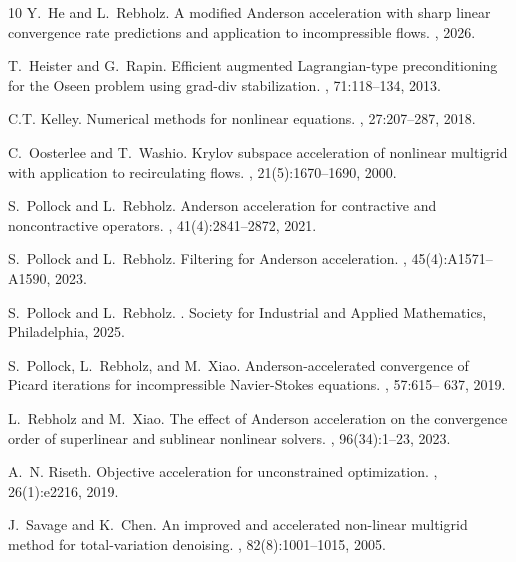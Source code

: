 \documentclass{article}
\numberwithin{equation}{section}
\begin{document}
\begin{thebibliography}{10}
Y.~He and L.~Rebholz.
\newblock A modified {A}nderson acceleration with sharp linear convergence rate
  predictions and application to incompressible flows.
, 2026.

T.~Heister and G.~Rapin.
\newblock Efficient augmented {L}agrangian-type preconditioning for the {O}seen
  problem using grad-div stabilization.
, 71:118--134, 2013.

C.T. Kelley.
\newblock Numerical methods for nonlinear equations.
, 27:207--287, 2018.

C.~Oosterlee and T.~Washio.
\newblock Krylov subspace acceleration of nonlinear multigrid with application
  to recirculating flows.
, 21(5):1670--1690, 2000.

S.~Pollock and L.~Rebholz.
\newblock Anderson acceleration for contractive and noncontractive operators.
, 41(4):2841--2872, 2021.

S.~Pollock and L.~Rebholz.
\newblock Filtering for {A}nderson acceleration.
, 45(4):A1571--A1590, 2023.

S.~Pollock and L.~Rebholz.
.
\newblock Society for Industrial and Applied Mathematics, Philadelphia, 2025.

S.~Pollock, L.~Rebholz, and M.~Xiao.
\newblock Anderson-accelerated convergence of {P}icard iterations for
  incompressible {N}avier-{S}tokes equations.
, 57:615-- 637, 2019.

L.~Rebholz and M.~Xiao.
\newblock The effect of {A}nderson acceleration on the convergence order of
  superlinear and sublinear nonlinear solvers.
, 96(34):1--23, 2023.

A.~N. Riseth.
\newblock Objective acceleration for unconstrained optimization.
, 26(1):e2216, 2019.

J.~Savage and K.~Chen.
\newblock An improved and accelerated non-linear multigrid method for
  total-variation denoising.
,
  82(8):1001--1015, 2005.


\end{thebibliography}
\end{document}
